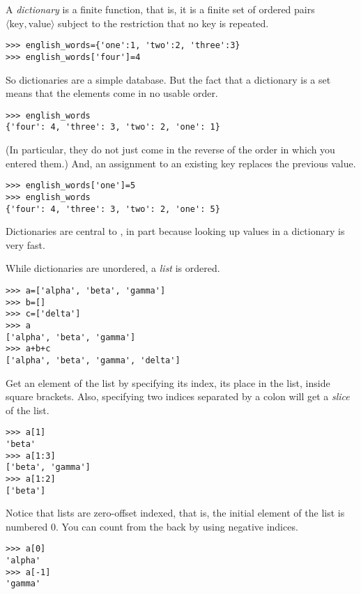 A \python{} \textit{dictionary} is a finite function, that is, it is a finite
set of ordered pairs $\langle\text{key},\text{value}\rangle$ subject 
to the restriction that no key is repeated.
\begin{lstlisting}[style=python]
>>> english_words={'one':1, 'two':2, 'three':3}
>>> english_words['four']=4  
\end{lstlisting}
So dictionaries are a simple database.
But the fact that a dictionary is a set means that the elements come in 
no usable order.
\begin{lstlisting}[style=python]
>>> english_words
{'four': 4, 'three': 3, 'two': 2, 'one': 1}
\end{lstlisting}
(In particular, they do not just come in the reverse of the order
in which you entered them.)
And, an assignment to an existing key replaces the previous value. 
\begin{lstlisting}[style=python]
>>> english_words['one']=5
>>> english_words
{'four': 4, 'three': 3, 'two': 2, 'one': 5}
\end{lstlisting}
Dictionaries are central to \python, in part because looking up values 
in a dictionary is very fast.

While dictionaries are unordered, a \python{} \textit{list} is ordered.
\begin{lstlisting}[style=python]
>>> a=['alpha', 'beta', 'gamma']
>>> b=[]
>>> c=['delta']
>>> a
['alpha', 'beta', 'gamma']
>>> a+b+c
['alpha', 'beta', 'gamma', 'delta']
\end{lstlisting}
Get an element of the list by specifying its index, its place in the list,
inside square brackets.
Also, specifying two indices separated by a colon will get a \textit{slice} 
of the list. 
\begin{lstlisting}[style=python]
>>> a[1]
'beta'
>>> a[1:3]
['beta', 'gamma']
>>> a[1:2]
['beta']
\end{lstlisting}
Notice that lists are zero-offset indexed, that is, the initial element of the
list is numbered $0$.
You can count from the back by using negative indices.
\begin{lstlisting}[style=python]
>>> a[0]
'alpha'
>>> a[-1]
'gamma'
\end{lstlisting}

